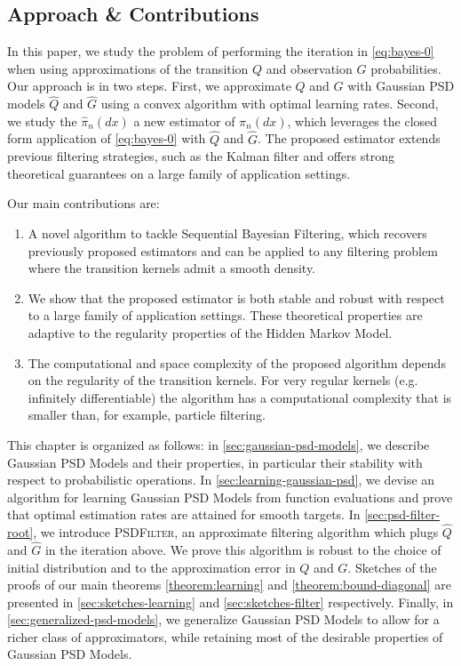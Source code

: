\subsection*{Approach \& Contributions}
In this paper, we study the problem of performing the iteration in \cref{eq:bayes-0} when using approximations of the transition $Q$ and observation $G$ probabilities. Our approach is in two steps. First, we approximate $Q$ and $G$ with Gaussian PSD models $\hat Q$ and $\hat G$ using a convex algorithm with optimal learning rates. Second, we study the $\hat \pi_n(dx)$ a new estimator of $\pi_n(dx)$, which leverages the closed form application of \cref{eq:bayes-0} with $\hat Q$ and $\hat G$. The proposed estimator extends previous filtering strategies, such as the Kalman filter and offers strong theoretical guarantees on a large family of application settings.

Our main contributions are:
 \begin{enumerate}
     \item A novel algorithm to tackle Sequential Bayesian Filtering, which recovers previously proposed estimators and can be applied to any filtering problem where the transition kernels admit a smooth density.
     \item We show that the proposed estimator is both stable and robust with respect to a large family of application settings. These theoretical properties are adaptive to the regularity properties of the Hidden Markov Model.
     \item The computational and space complexity of the proposed algorithm depends on the regularity of the transition kernels. For very regular kernels (e.g. infinitely differentiable) the algorithm has a computational complexity that is smaller than, for example, particle filtering.
 \end{enumerate}


This chapter is organized as follows: in \cref{sec:gaussian-psd-models}, we describe Gaussian PSD Models and their properties, in particular their stability with respect to probabilistic operations. In \cref{sec:learning-gaussian-psd}, we devise an algorithm for learning Gaussian PSD Models from function evaluations and prove that optimal estimation rates are attained for smooth targets. In \cref{sec:psd-filter-root}, we introduce \textsc{PSDFilter}, an approximate filtering algorithm which plugs $\hat Q$ and $\hat G$ in the iteration above. We prove this algorithm is robust to the choice of initial distribution and to the approximation error in $Q$ and $G$. Sketches of the proofs of our main theorems \cref{theorem:learning} and \cref{theorem:bound-diagonal} are presented in \cref{sec:sketches-learning} and \cref{sec:sketches-filter} respectively. Finally, in \cref{sec:generalized-psd-models}, we generalize Gaussian PSD Models to allow for a richer class of approximators, while retaining most of the desirable properties of Gaussian PSD Models.

